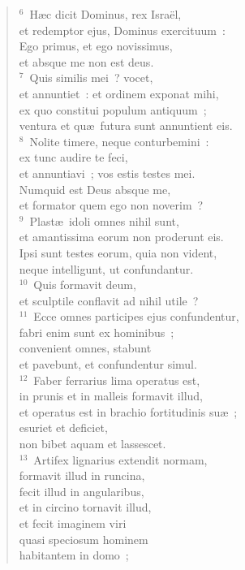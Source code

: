 \begin{verse}${}^{6}$~H\ae c dicit Dominus, rex Isra\"el,\\ et redemptor ejus, Dominus exercituum~:\\ Ego primus, et ego novissimus,\\ et absque me non est deus.\\
${}^{7}$~Quis similis mei~? vocet,\\ et annuntiet~: et ordinem exponat mihi,\\ ex quo constitui populum antiquum~;\\ ventura et qu\ae\ futura sunt annuntient eis.\\
${}^{8}$~Nolite timere, neque conturbemini~:\\ ex tunc audire te feci,\\ et annuntiavi~; vos estis testes mei.\\ Numquid est Deus absque me,\\ et formator quem ego non noverim~?\\
${}^{9}$~Plast\ae\ idoli omnes nihil sunt,\\ et amantissima eorum non proderunt eis.\\ Ipsi sunt testes eorum, quia non vident,\\ neque intelligunt, ut confundantur.\\
${}^{10}$~Quis formavit deum,\\ et sculptile conflavit ad nihil utile~?\\
${}^{11}$~Ecce omnes participes ejus confundentur,\\ fabri enim sunt ex hominibus~;\\ convenient omnes, stabunt\\ et pavebunt, et confundentur simul.\\
${}^{12}$~Faber ferrarius lima operatus est,\\ in prunis et in malleis formavit illud,\\ et operatus est in brachio fortitudinis su\ae~;\\ esuriet et deficiet,\\ non bibet aquam et lassescet.\\
${}^{13}$~Artifex lignarius extendit normam,\\ formavit illud in runcina,\\ fecit illud in angularibus,\\ et in circino tornavit illud,\\ et fecit imaginem viri\\ quasi speciosum hominem\\ habitantem in domo~;\\

\end{verse}
